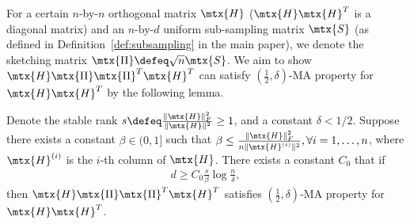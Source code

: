 \documentclass{article}
\begin{document}
For a certain $n$-by-$n$ orthogonal matrix $\mtx{H}$ ($\mtx{H} \mtx{H}^T$ is a diagonal matrix) 
and an $n$-by-$d$ uniform sub-sampling matrix $\mtx{S}$ (as defined in Definition~\ref{def:subsampling} in the main paper),
we denote the sketching matrix $\mtx{\Pi} \defeq \sqrt{n} \mtx{S}$.
We aim to show $\mtx{H} \mtx{\Pi} \mtx{\Pi}^T \mtx{H}^T$ can satisfy $(\frac12, \delta)$-MA property for $\mtx{H} \mtx{H}^T$ by the following lemma.
\begin{lemma}
\label{lem:frac12MA}
Denote the stable rank $s \defeq \frac{\|\mtx{H}\|_F^2}{\|\mtx{H}\|^2} \geq 1$, and a constant $\delta < 1/2$. 
Suppose there exists a constant $\beta \in (0, 1]$ such that $\beta \leq \frac{\|\mtx{H}\|_F^2}{n \|\mtx{H}^{(i)}\|^2}, \forall i = 1,\dots,n$,
where $\mtx{H}^{(i)}$ is the $i$-th column of $\mtx{H}$. 
There exists a constant $C_0$ that if 
\begin{align*}
d \geq C_0 \frac{s}{\beta} \log \frac{n}{\delta}, 
\end{align*}
then $\mtx{H} \mtx{\Pi} \mtx{\Pi}^T \mtx{H}^T$ satisfies $(\frac12, \delta)$-MA property for $\mtx{H} \mtx{H}^T$.
\end{lemma}
\end{document}
